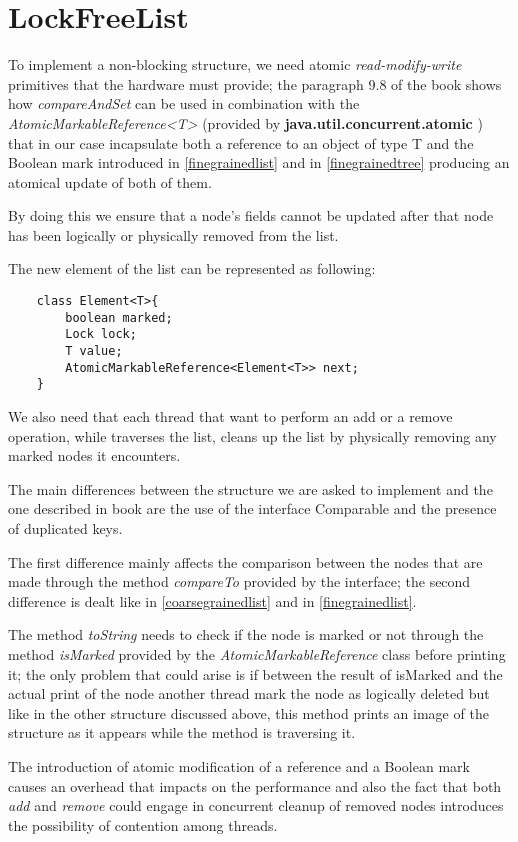 \section{LockFreeList}
\label{lockfreelist}

To implement a non-blocking structure, we need atomic \emph{read-modify-write} primitives that the hardware must provide; the paragraph 9.8 of the book shows how \emph{compareAndSet} can be used in combination with the \emph{AtomicMarkableReference<T>}  (provided by \textbf{java.util.concurrent.atomic} ) that in our case incapsulate both a reference to an object of type T and the Boolean mark introduced in \ref{finegrainedlist} and in \ref{finegrainedtree} producing an atomical update of both of them.
\newline

By doing this we ensure that a node's fields cannot be updated after that node has been logically or physically removed from the list. 

The new element of the list can be represented as following:\newline

\begin{lstlisting}
	class Element<T>{
		boolean marked;
		Lock lock;
		T value;
		AtomicMarkableReference<Element<T>> next;
	}
\end{lstlisting}

We also need that each thread that want to perform an add or a remove operation, while traverses the list, cleans up the list by physically removing any marked nodes it encounters.

The main differences between the structure we are asked to implement and the one described in book are the use of the interface Comparable and the presence of duplicated keys.

The first difference mainly affects the comparison between the nodes that are made through the method \emph{compareTo} provided by the interface;
the second difference is dealt like in \ref{coarsegrainedlist} and in \ref{finegrainedlist}.

The method \emph{toString} needs to check if the node is marked or not through the method \emph{isMarked} provided by the \emph{AtomicMarkableReference} class before printing it; the only problem that could arise is if between the result of isMarked and the actual print of the node another thread mark the node as logically deleted but like in the other structure discussed above, this method prints an image of the structure as it appears while the method is traversing it.

The introduction of atomic modification of a reference and a Boolean mark causes an overhead that impacts on the performance and also the fact that both \emph{add} and \emph{remove} could engage in concurrent cleanup of removed nodes introduces the possibility of contention among threads.
